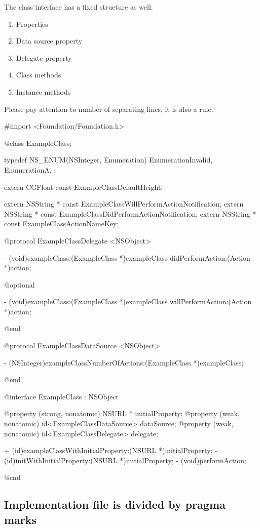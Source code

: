 \documentclass[10pt]{extarticle}
\newenvironment{codelisting}
{\footnotesize\mdframed[middlelinewidth=0.5pt, middlelinecolor=BaliHaiColor, skipabove=15pt]\verbatim}
{\endverbatim\endmdframed\vspace{12pt}\normalsize}
\begin{document}
The class interface has a fixed structure as well:

\begin{enumerate}
\item Properties
\item Data source property
\item Delegate property
\item Class methods
\item Instance methods
\end{enumerate}

Please pay attention to number of separating lines, it is also a rule.

\begin{codelisting}
#import <Foundation/Foundation.h>

@class ExampleClass;


typedef NS_ENUM(NSInteger, Enumeration) {
    EnumerationInvalid,
    EnumerationA,
};

extern CGFloat const ExampleClassDefaultHeight;

extern NSString * const ExampleClassWillPerformActionNotification;
extern NSString * const ExampleClassDidPerformActionNotification;
extern NSString * const ExampleClassActionNameKey;


@protocol ExampleClassDelegate <NSObject>

- (void)exampleClass:(ExampleClass *)exampleClass didPerformAction:(Action *)action;

@optional

- (void)exampleClass:(ExampleClass *)exampleClass willPerformAction:(Action *)action;

@end


@protocol ExampleClassDataSource <NSObject>

- (NSInteger)exampleClassNumberOfActions:(ExampleClass *)exampleClass;

@end


@interface ExampleClass : NSObject

@property (strong, nonatomic) NSURL * initialProperty;
@property (weak, nonatomic) id<ExampleClassDataSource> dataSource;
@property (weak, nonatomic) id<ExampleClassDelegate> delegate;

+ (id)exampleClassWithInitialProperty:(NSURL *)initialProperty;
- (id)initWithInitialProperty:(NSURL *)initialProperty;
- (void)performAction;

@end
\end{codelisting}


\subsection{Implementation file is divided by pragma marks}
\end{document}
